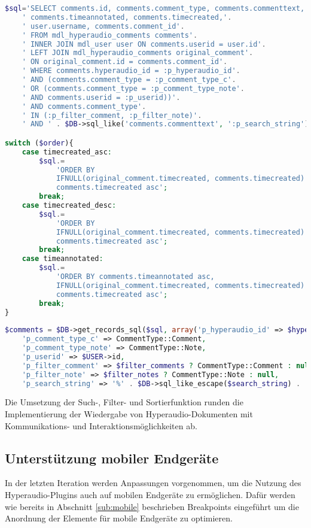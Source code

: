 \begin{lstlisting}[language=php,
             linewidth=\textwidth,
             caption={Ausschnitt der \textbf{external.php} in der 11. Iteration},
             label={lst:it11:external}]
$sql='SELECT comments.id, comments.comment_type, comments.commenttext,'.
    ' comments.timeannotated, comments.timecreated,'.
    ' user.username, comments.comment_id'.
    ' FROM mdl_hyperaudio_comments comments'.
    ' INNER JOIN mdl_user user ON comments.userid = user.id'.
    ' LEFT JOIN mdl_hyperaudio_comments original_comment'.
    ' ON original_comment.id = comments.comment_id'.
    ' WHERE comments.hyperaudio_id = :p_hyperaudio_id'.
    ' AND (comments.comment_type = :p_comment_type_c'.
    ' OR (comments.comment_type = :p_comment_type_note'.
    ' AND comments.userid = :p_userid))'.
    ' AND comments.comment_type'.
    ' IN (:p_filter_comment, :p_filter_note)'.
    ' AND ' . $DB->sql_like('comments.commenttext', ':p_search_string');

switch ($order){
    case timecreated_asc:
        $sql.= 
            'ORDER BY
            IFNULL(original_comment.timecreated, comments.timecreated) asc,
            comments.timecreated asc';
        break;
    case timecreated_desc:
        $sql.= 
            'ORDER BY
            IFNULL(original_comment.timecreated, comments.timecreated) desc,
            comments.timecreated asc';
        break;
    case timeannotated:
        $sql.=
            'ORDER BY comments.timeannotated asc,
            IFNULL(original_comment.timecreated, comments.timecreated) asc,
            comments.timecreated asc';
        break;
}
        
$comments = $DB->get_records_sql($sql, array('p_hyperaudio_id' => $hyperaudio_id,
    'p_comment_type_c' => CommentType::Comment,
    'p_comment_type_note' => CommentType::Note,
    'p_userid' => $USER->id,
    'p_filter_comment' => $filter_comments ? CommentType::Comment : null,
    'p_filter_note' => $filter_notes ? CommentType::Note : null,
    'p_search_string' => '%' . $DB->sql_like_escape($search_string) . '%'));
\end{lstlisting}

Die Umsetzung der Such-, Filter- und Sortierfunktion runden die Implementierung der Wiedergabe von Hyperaudio-Dokumenten mit Kommunikations- und Interaktionsmöglichkeiten ab.

\subsection{Unterstützung mobiler Endgeräte}
In der letzten Iteration werden Anpassungen vorgenommen, um die Nutzung des Hyperaudio-Plugins auch auf mobilen Endgeräte zu ermöglichen. Dafür werden wie bereits in Abschnitt \ref{sub:mobile} beschrieben Breakpoints eingeführt um die Anordnung der Elemente für mobile Endgeräte zu optimieren.

